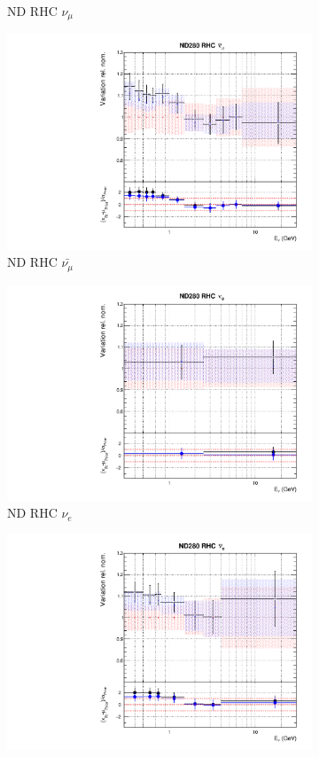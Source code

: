 \begin{figure}
\begin{subfigure}{0.24\textwidth}
  \caption{ND RHC $\nu_{\mu}$}
\end{subfigure}
\begin{subfigure}{0.24\textwidth}
  \centering
  \includegraphics[width=0.95\linewidth]{figs/comp5q2vs8q2flux5}
  \caption{ND RHC $\bar{\nu_{\mu}}$}
\end{subfigure}
\begin{subfigure}{0.24\textwidth}
  \centering
  \includegraphics[width=0.95\linewidth]{figs/comp5q2vs8q2flux6}
  \caption{ND RHC $\nu_{e}$}
\end{subfigure}
\vspace{15mm}
\begin{subfigure}{0.24\textwidth}
  \centering
  \includegraphics[width=0.95\linewidth]{figs/comp5q2vs8q2flux7}

\end{subfigure}
\end{figure}
